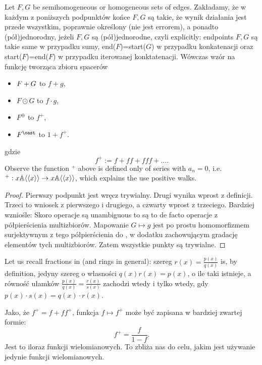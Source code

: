 \begin{lm}
	Let $F,G$ be semihomogeneous or homogeneous sets of edges. Zakładamy, że w każdym z poniższych podpunktów końce $F, G$ są takie, że wynik działania jest przede wszystkim, poprawnie określony (nie jest errorem), a ponadto (pół)jednorodny, jeżeli $F,G$ są (pół)jednorodne, czyli explicitly: endpoints $F,G$ są takie same w przypadku sumy, end($F$)=start($G$) w przypadku konkatenacji oraz start($F$)=end($F$) w przypadku iterowanej konktatenacji.
	 Wówczas wzór na funkcję tworząca zbioru spacerów
	\begin{itemize}
		\item $F + G $ to $f+g$, 
		\item $F \odot G$ to $f\cdot g$,
		\item $F^\oplus $ to $f^+$,
		\item $F^{\oast}$ to $1 + f^+$.
	\end{itemize}
\end{lm}
gdzie
	$$
		f^+:=f + ff + fff + \ldots.
	$$
Observe the function $^+$ above is defined only of series with $a_n = 0$, i.e. $^+ : x \mathbb{ A } \langle\langle x \rangle\rangle  \rightarrow x \mathbb{ A } \langle\langle x \rangle\rangle $, which explains the use positive walks.
\begin{proof}
	Pierwszy podpunkt jest wręcz trywialny. Drugi wynika wprost z definicji. Trzeci to wniosek z pierwszego i drugiego, a czwarty wprost z trzeciego.
	Bardziej wzniośle: Skoro operacje są unambiguous to są to de facto operacje z półpierścienia multizbiorów. Mapowanie $G \mapsto g$ jest po prostu homomorfizmem surjektywnym z tego półpierścienia do \Ax, w dodatku zachowującym gradację elementów tych multizbiorów. Zatem wszystkie punkty są trywialne.
\end{proof}
%
%
Let us recall fractions in \Ax (and rings in general): szereg $r(x) = \frac{p(x)}{q(x)}$ is, by definition, jedyny szereg o własności $q(x)r(x) = p(x)$, o ile taki istnieje, a równość ułamków $\frac{p(x)}{q(x)} = \frac{r(x)}{s(x)}$ zachodzi wtedy i tylko wtedy, gdy $p(x) \cdot s(x)=q(x) \cdot r(x)$.

Jako, że $f^+ = f + ff^+$, funkcja $ f \mapsto f^+$ może być zapisana w bardziej zwartej formie:
\begin{equation}\label{eq::^+jestFunkcjaWymierna}
	f^+ = \frac{f}{1-f}.
\end{equation}
Jest to iloraz funkcji wielomianowych. To zbliża nas do celu, jakim jest używanie jedynie funkcji wielomianowych.
%
%
